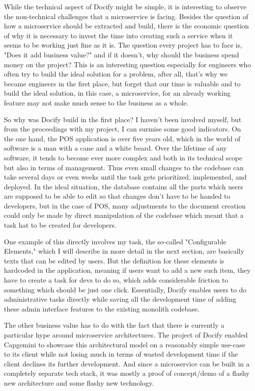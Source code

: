 While the technical aspect of Docify might be simple, it is interesting to observe the non-technical challenges that a microservice is facing. Besides the question of how a microservice should be extracted and build, there is the economic question of why it is necessary to invest the time into creating such a service when it seems to be working just fine as it is. The question every project has to face is, "Does it add business value?" and if it doesn't, why should the business spend money on the project? This is an interesting question especially for engineers who often try to build the ideal solution for a problem, after all, that's why we became engineers in the first place, but forget that our time is valuable and to build the ideal solution, in this case, a microservice, for an already working feature may not make much sense to the business as a whole.

So why was Docify build in the first place? I haven't been involved myself, but from the proceedings with my project, I can surmise some good indicators. On the one hand, the POS application is over five years old, which in the world of software is a man with a cane and a white beard. Over the lifetime of any software, it tends to become ever more complex and both in its technical scope but also in terms of management. Thus even small changes to the codebase can take several days or even weeks until the task gets prioritized, implemented, and deployed. In the ideal situation, the database contains all the parts which users are supposed to be able to edit so that changes don't have to be handed to developers, but in the case of POS, many adjustments to the document creation could only be made by direct manipulation of the codebase which meant that a task hat to be created for developers.

One example of this directly involves my task, the so-called "Configurable Elements," which I will describe in more detail in the next section, are basically texts that can be edited by users. But the definition for these elements is hardcoded in the application, meaning if users want to add a new such item, they have to create a task for devs to do so, which adds considerable friction to something which should be just one click. Essentially, Docify enables users to do administrative tasks directly while saving all the development time of adding these admin interface features to the existing monolith codebase.

The other business value has to do with the fact that there is currently a particular hype around microservice architectures. The project of Docify enabled Capgemini to showcase this architectural model on a reasonably simple use-case to its client while not losing much in terms of wasted development time if the client declines its further development. And since a microservice can be built in a completely separate tech stack, it was mostly a proof of concept/demo of a flashy new architecture and some flashy new technology.

